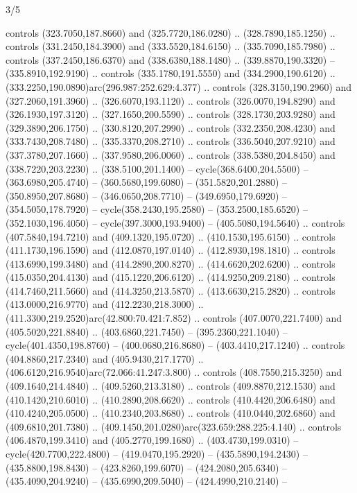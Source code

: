 \begin{flagdescription}{3/5}
\begin{scope} [xshift=0.5\flagwidth*\stretchfactor,yshift=0.5\flagwidth,scale=\flagwidth/391]
\begin{scope}[y=0.8pt, x=0.8pt, yscale=-1, xscale=1,line width=0.01\lw,shift={(-98.875,-338.125)}]
\begin{scope}[cm={{0.15382,0.0,0.0,0.15382,(34.72393,273.11413)}}]
  controls (323.7050,187.8660) and (325.7720,186.0280) .. (328.7890,185.1250) ..
  controls (331.2450,184.3900) and (333.5520,184.6150) .. (335.7090,185.7980) ..
  controls (337.2450,186.6370) and (338.6380,188.1480) .. (339.8870,190.3320) --
  (335.8910,192.9190) .. controls (335.1780,191.5550) and (334.2900,190.6120) ..
  (333.2250,190.0890)arc(296.987:252.629:4.377) .. controls (328.3150,190.2960)
  and (327.2060,191.3960) .. (326.6070,193.1120) .. controls (326.0070,194.8290)
  and (326.1930,197.3120) .. (327.1650,200.5590) .. controls (328.1730,203.9280)
  and (329.3890,206.1750) .. (330.8120,207.2990) .. controls (332.2350,208.4230)
  and (333.7430,208.7480) .. (335.3370,208.2710) .. controls (336.5040,207.9210)
  and (337.3780,207.1660) .. (337.9580,206.0060) .. controls (338.5380,204.8450)
  and (338.7220,203.2230) .. (338.5100,201.1400) -- cycle(368.6400,204.5500) --
  (363.6980,205.4740) -- (360.5680,199.6080) -- (351.5820,201.2880) --
  (350.8950,207.8680) -- (346.0650,208.7710) -- (349.6950,179.6920) --
  (354.5050,178.7920) -- cycle(358.2430,195.2580) -- (353.2500,185.6520) --
  (352.1030,196.4050) -- cycle(397.3000,193.9400) -- (405.5080,194.5640) ..
  controls (407.5840,194.7210) and (409.1320,195.0720) .. (410.1530,195.6150) ..
  controls (411.1730,196.1590) and (412.0870,197.0140) .. (412.8930,198.1810) ..
  controls (413.6990,199.3480) and (414.2890,200.8270) .. (414.6620,202.6200) ..
  controls (415.0350,204.4130) and (415.1220,206.6120) .. (414.9250,209.2180) ..
  controls (414.7460,211.5660) and (414.3250,213.5870) .. (413.6630,215.2820) ..
  controls (413.0000,216.9770) and (412.2230,218.3000) ..
  (411.3300,219.2520)arc(42.800:70.421:7.852) .. controls (407.0070,221.7400)
  and (405.5020,221.8840) .. (403.6860,221.7450) -- (395.2360,221.1040) --
  cycle(401.4350,198.8760) -- (400.0680,216.8680) -- (403.4410,217.1240) ..
  controls (404.8860,217.2340) and (405.9430,217.1770) ..
  (406.6120,216.9540)arc(72.066:41.247:3.800) .. controls (408.7550,215.3250)
  and (409.1640,214.4840) .. (409.5260,213.3180) .. controls (409.8870,212.1530)
  and (410.1420,210.6010) .. (410.2890,208.6620) .. controls (410.4420,206.6480)
  and (410.4240,205.0500) .. (410.2340,203.8680) .. controls (410.0440,202.6860)
  and (409.6810,201.7380) .. (409.1450,201.0280)arc(323.659:288.225:4.140) ..
  controls (406.4870,199.3410) and (405.2770,199.1680) .. (403.4730,199.0310) --
  cycle(420.7700,222.4800) -- (419.0470,195.2920) -- (435.5890,194.2430) --
  (435.8800,198.8430) -- (423.8260,199.6070) -- (424.2080,205.6340) --
  (435.4090,204.9240) -- (435.6990,209.5040) -- (424.4990,210.2140) --

\end{scope}
\end{scope}
\end{scope}
\end{flagdescription}
